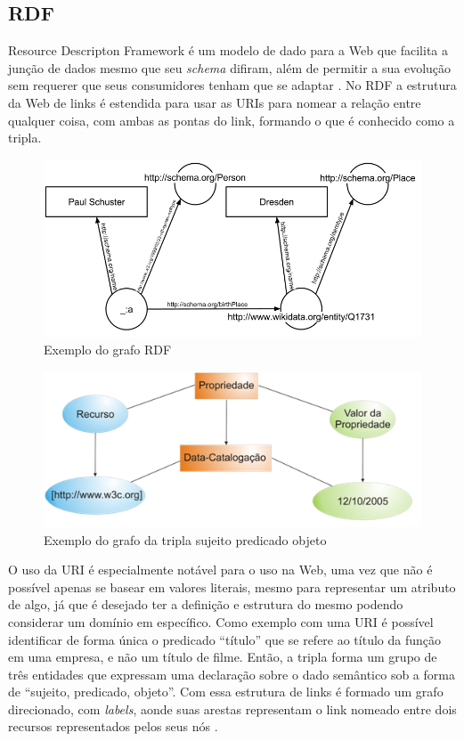 \subsection{RDF}

Resource Descripton Framework é um modelo de dado para a Web que facilita a junção de dados mesmo que seu \textit{schema} difiram, além de permitir a sua evolução sem requerer que seus consumidores tenham que se adaptar \citep{W3CRDF}. No RDF a estrutura da Web de links é estendida para usar as URIs para nomear a relação entre qualquer coisa, com ambas as pontas do link, formando o que é conhecido como a tripla.

\begin{figure}
	\centering
	\includegraphics[scale=0.40]{imagens/rdf_example1.png}
	\caption{Exemplo do grafo RDF \citep{RDFWikiImage}}
	\label{fig:rdf_graph}
\end{figure}

\begin{figure}
	\centering
	\includegraphics[scale=0.65]{imagens/rdf_example2.png}
	\caption{Exemplo do grafo da tripla sujeito predicado objeto \citep{WebSemanticaDevmedia}}
	\label{fig:rdf_graph2}
\end{figure}

O uso da URI é especialmente notável para o uso na Web, uma vez que não é possível apenas se basear em valores literais, mesmo para representar um atributo de algo, já que é desejado ter a definição e estrutura do mesmo podendo considerar um domínio em específico. Como exemplo com uma URI é possível identificar de forma única o predicado “título” que se refere ao título da função em uma empresa, e não um título de filme. Então, a tripla forma um grupo de três entidades que expressam uma declaração sobre o dado semântico sob a forma de “sujeito, predicado, objeto”. Com essa estrutura de links é formado um grafo direcionado, com \textit{labels}, aonde suas arestas representam o link nomeado entre dois recursos representados pelos seus nós \citep{W3CRDF}.

